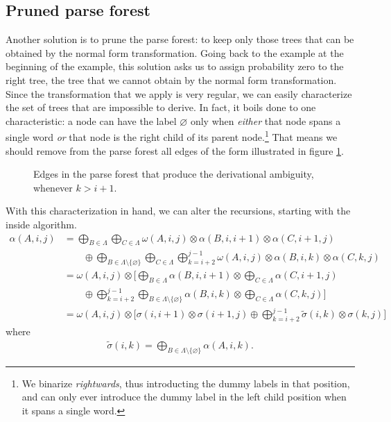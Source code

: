   \subsection{Pruned parse forest}
    Another solution is to prune the parse forest: to keep only those trees that can be obtained by the normal form transformation. Going back to the example at the beginning of the example, this solution asks us to assign probability zero to the right tree, the tree that we cannot obtain by the normal form transformation. Since the transformation that we apply is very regular, we can easily characterize the set of trees that are impossible to derive. In fact, it boils done to one characteristic: a node can have the label $\varnothing$ only when \textit{either} that node spans a single word \textit{or} that node is the right child of its parent node.\footnote{We binarize \textit{rightwards}, thus introducting the dummy labels in that position, and can only ever introduce the dummy label in the left child position when it spans a single word.} That means we should remove from the parse forest all edges of the form illustrated in figure \ref{fig:illegal-edges}.
    \begin{figure}[h]
      \center
      \begin{tikzpicture}[scale=.6]
        
      \end{tikzpicture}
      \caption{Edges in the parse forest that produce the derivational ambiguity, whenever $k > i+1$.}
      \label{fig:illegal-edges}
    \end{figure}

    With this characterization in hand, we can alter the recursions, starting with the inside algorithm.
    \begin{align*}
      \alpha(A, i, j)
        &= \displaystyle\bigoplus_{B \in \Lambda} \displaystyle\bigoplus_{C \in \Lambda} \omega(A, i, j) \otimes \alpha(B,i,i+1) \otimes \alpha(C,i+1,j) \\
          &\qquad\oplus \displaystyle\bigoplus_{B \in \Lambda \setminus \{ \varnothing \} } \displaystyle\bigoplus_{C \in \Lambda} \displaystyle\bigoplus_{k=i+2}^{j-1} \omega(A, i, j) \otimes \alpha(B,i,k) \otimes \alpha(C,k,j) \\
        &= \omega(A, i, j) \otimes  \Bigg[ \displaystyle\bigoplus_{B \in \Lambda}\alpha(B,i,i+1) \otimes  \displaystyle\bigoplus_{C \in \Lambda} \alpha(C,i+1,j)  \\
          &\qquad\oplus \displaystyle\bigoplus_{k=i+2}^{j-1} \displaystyle\bigoplus_{B \in \Lambda \setminus \{ \varnothing \} } \alpha(B,i,k) \otimes \displaystyle\bigoplus_{C \in \Lambda} \alpha(C,k,j)  \Bigg]  \\
        &= \omega(A, i, j) \otimes \Bigg[ \sigma(i,i+1) \otimes \sigma(i+1,j) \oplus \displaystyle\bigoplus_{k=i+2}^{j-1} \tilde{\sigma}(i,k) \otimes \sigma(k,j) \Bigg]
    \end{align*}
    where
    \begin{align*}
      \tilde{\sigma}(i,k) =  \displaystyle\bigoplus_{B \in \Lambda \setminus \{ \varnothing \} } \alpha(A, i, k).
    \end{align*}

